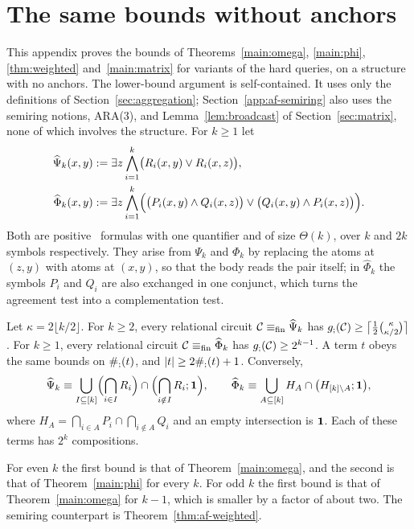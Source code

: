 \section{The same bounds without anchors}\label{app:anchor-free}
This appendix proves the bounds of Theorems~\ref{main:omega},
\ref{main:phi}, \ref{thm:weighted} and~\ref{main:matrix} for variants of
the hard queries, on a structure with no anchors. The lower-bound argument
is self-contained. It uses only the definitions of
Section~\ref{sec:aggregation}; Section~\ref{app:af-semiring} also uses the
semiring notions, ARA(3), and Lemma~\ref{lem:broadcast} of
Section~\ref{sec:matrix}, none of which involves the structure. For
$k\ge1$ let
\begin{align*}
 \widehat\Psi_k(x,y)&:=\exists z\bigwedge_{i=1}^k
 \bigl(R_i(x,y)\lor R_i(x,z)\bigr),\\
 \widehat\Phi_k(x,y)&:=\exists z\bigwedge_{i=1}^k
 \Bigl(\bigl(P_i(x,y)\land Q_i(x,z)\bigr)\lor
       \bigl(Q_i(x,y)\land P_i(x,z)\bigr)\Bigr).
\end{align*}
Both are positive \FOthree\ formulas with one quantifier and of size
$\Theta(k)$, over $k$ and $2k$ symbols respectively. They arise from
$\Psi_k$ and $\Phi_k$ by replacing the atoms at $(z,y)$ with atoms at
$(x,y)$, so that the body reads the pair itself; in $\widehat\Phi_k$ the
symbols $P_i$ and $Q_i$ are also exchanged in one conjunct, which turns the
agreement test into a complementation test.

\begin{theorem}\label{thm:anchor-free}
Let $\kappa=2\lfloor k/2\rfloor$. For $k\ge2$, every relational circuit
$\mathcal C\equiv_{\rm fin}\widehat\Psi_k$ has
$g_{;}(\mathcal C)\ge\bigl\lceil\frac12\binom{\kappa}{\kappa/2}\bigr\rceil$.
For $k\ge1$, every relational circuit $\mathcal C\equiv_{\rm fin}\widehat\Phi_k$
has $g_{;}(\mathcal C)\ge2^{k-1}$. A term $t$ obeys the same bounds on
$\#_{;}(t)$, and $|t|\ge2\#_{;}(t)+1$. Conversely,
\begin{equation}\label{eq:af-upper}
 \widehat\Psi_k\equiv\bigcup_{I\subseteq[k]}
 \Bigl(\bigcap_{i\in I}R_i\Bigr)\cap
 \Bigl(\bigcap_{i\notin I}R_i;\mathbf{1}\Bigr),
 \qquad
 \widehat\Phi_k\equiv\bigcup_{A\subseteq[k]}H_A\cap
 \bigl(H_{[k]\setminus A};\mathbf{1}\bigr),
\end{equation}
where $H_A=\bigcap_{i\in A}P_i\cap\bigcap_{i\notin A}Q_i$ and an empty
intersection is $\mathbf{1}$. Each of these terms has $2^k$ compositions.
\end{theorem}
For even $k$ the first bound is that of Theorem~\ref{main:omega}, and the
second is that of Theorem~\ref{main:phi} for every $k$. For odd $k$ the
first bound is that of Theorem~\ref{main:omega} for $k-1$, which is smaller
by a factor of about two. The semiring counterpart is
Theorem~\ref{thm:af-weighted}.

